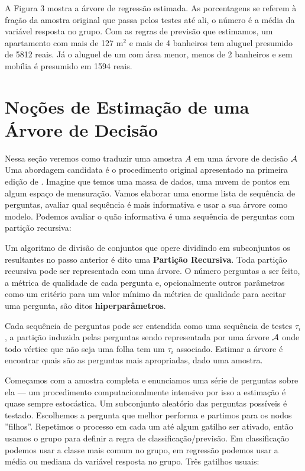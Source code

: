 A Figura 3 mostra a árvore de regressão estimada. As porcentagens se referem à fração da amostra original que passa pelos testes até ali, o número é a média da variável resposta no grupo. Com as regras de previsão que estimamos, um apartamento com mais de 127 m$^2$ e mais de 4 banheiros tem aluguel presumido de 5812 reais. Já o aluguel de um com área menor, menos de 2 banheiros e sem mobília é presumido em 1594 reais.
 
 
\section{Noções de Estimação de uma Árvore de Decisão}

Nessa seção veremos como traduzir uma amostra $A$ em uma árvore de decisão $\mathcal{A}$ Uma abordagem candidata é o procedimento original apresentado na primeira edição de . Imagine que temos uma massa de dados, uma nuvem de pontos em algum espaço de mensuração. Vamos elaborar uma enorme lista de sequência de perguntas, avaliar qual sequência é mais informativa e usar a sua árvore como modelo. Podemos avaliar o quão informativa é uma sequência de perguntas com partição recursiva:

\begin{defi}
Um algoritmo de divisão de conjuntos que opere dividindo em subconjuntos os resultantes no passo anterior é dito uma \textbf{Partição Recursiva}. Toda partição recursiva pode ser representada com uma árvore. O número perguntas a ser feito, a métrica de qualidade de cada pergunta e, opcionalmente outros parâmetros como um critério para um valor mínimo da métrica de qualidade para aceitar uma pergunta, são ditos \textbf{hiperparâmetros}.
\end{defi}

Cada sequência de perguntas pode ser entendida como uma sequência de testes $\tau_i$, a partição induzida pelas perguntas sendo representada por uma árvore $\mathcal{A}$ onde todo vértice que não seja uma folha tem um $\tau_i$ associado. Estimar a árvore é encontrar quais são as perguntas mais apropriadas, dado uma amostra. 

Começamos com a amostra completa e enunciamos uma série de perguntas sobre ela — um procedimento computacionalmente intensivo por isso a estimação é quase sempre estocástica. Um subconjunto aleatório das perguntas possíveis é testado. Escolhemos a pergunta que melhor performa e partimos para os nodos ''filhos''. Repetimos o processo em cada um até algum gatilho ser ativado, então usamos o grupo para definir a regra de classificação/previsão. Em classificação podemos usar a classe mais comum no grupo, em regressão podemos usar a média ou mediana da variável resposta no grupo. Três gatilhos usuais:


